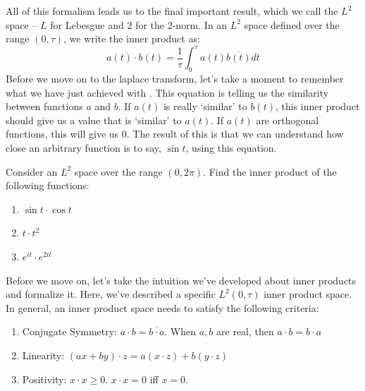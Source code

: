 All of this formalism leads us to the final important result, which we call the $L^2$ space -- $L$ for Lebesgue and $2$ for the 2-norm. In an $L^2$ space defined over the range $(0,\tau)$, we write the inner product as:
\begin{equation}\label{eq:inner product}
    a(t)\cdot b(t)=\frac{1}{\tau}\int_0^\tau{a(t)\overline{b(t)}}dt
\end{equation}
Before we move on to the \gls{laplace transform}, let's take a moment to remember what we have just achieved with . This equation is telling us the similarity between functions $a$ and $b$. If $a(t)$ is really `similar' to $b(t)$, this inner product should give us a value that is `similar' to $a(t)$. If $a(t)$ are orthogonal functions, this will give us 0. The result of this is that we can understand how close an arbitrary function is to say, $\sin{t}$, using this equation.

\begin{exercise}
Consider an $L^2$ space over the range $(0,2\pi)$. Find the inner product of the following functions:
\begin{enumerate}
    \item $\sin{t}\cdot\cos{t}$
    \item $t\cdot t^2$
    \item $e^{it}\cdot e^{2it}$
\end{enumerate}
\end{exercise}

Before we move on, let's take the intuition we've developed about inner products and formalize it. Here, we've described a specific $L^2(0,\tau)$ inner product space. In general, an inner product space needs to satisfy the following criteria:
\begin{enumerate}
    \item Conjugate Symmetry: $a\cdot b=\overline{b\cdot a}$. When $a,b$ are real, then $a\cdot b={b\cdot a}$
    \item Linearity: $(ax+by)\cdot z=a(x\cdot z)+b(y\cdot z)$
    \item Positivity: $x\cdot x \ge 0$. $x\cdot x =0$ iff $x=0$.
\end{enumerate}

